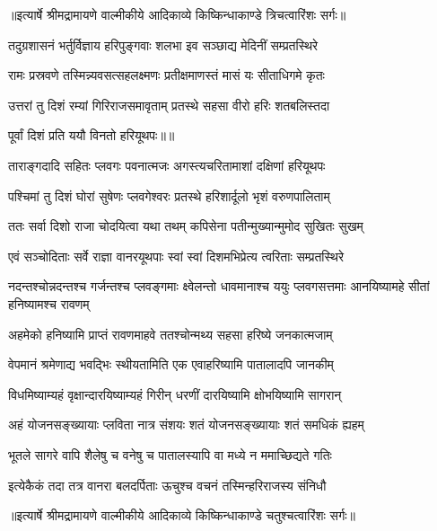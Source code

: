{॥इत्यार्षे श्रीमद्रामायणे वाल्मीकीये आदिकाव्ये किष्किन्धाकाण्डे त्रिचत्वारिंशः सर्गः॥}


\twolineshloka
{तदुग्रशासनं भर्तुर्विज्ञाय हरिपुङ्गवाः}
{शलभा इव सञ्छाद्य मेदिनीं सम्प्रतस्थिरे} %

\twolineshloka
{रामः प्रस्रवणे तस्मिन्न्यवसत्सहलक्ष्मणः}
{प्रतीक्षमाणस्तं मासं यः सीताधिगमे कृतः} %

\twolineshloka
{उत्तरां तु दिशं रम्यां गिरिराजसमावृताम्}
{प्रतस्थे सहसा वीरो हरिः शतबलिस्तदा} %

{पूर्वां दिशं प्रति ययौ विनतो हरियूथपः॥॥} %

\addtocounter{shlokacount}{1}

\twolineshloka
{ताराङ्गदादि सहितः प्लवगः पवनात्मजः}
{अगस्त्यचरितामाशां दक्षिणां हरियूथपः} %

\twolineshloka
{पश्चिमां तु दिशं घोरां सुषेणः प्लवगेश्वरः}
{प्रतस्थे हरिशार्दूलो भृशं वरुणपालिताम्} %

\twolineshloka
{ततः सर्वा दिशो राजा चोदयित्वा यथा तथम्}
{कपिसेना पतीन्मुख्यान्मुमोद सुखितः सुखम्} %

\twolineshloka
{एवं सञ्चोदिताः सर्वे राज्ञा वानरयूथपाः}
{स्वां स्वां दिशमभिप्रेत्य त्वरिताः सम्प्रतस्थिरे} %

\threelineshloka
{नदन्तश्चोन्नदन्तश्च गर्जन्तश्च प्लवङ्गमाः}
{क्ष्वेलन्तो धावमानाश्च ययुः प्लवगसत्तमाः}
{आनयिष्यामहे सीतां हनिष्यामश्च रावणम्} %

\twolineshloka
{अहमेको हनिष्यामि प्राप्तं रावणमाहवे}
{ततश्चोन्मथ्य सहसा हरिष्ये जनकात्मजाम्} %

\twolineshloka
{वेपमानं श्रमेणाद्य भवद्भिः स्थीयतामिति}
{एक एवाहरिष्यामि पातालादपि जानकीम्} %

\twolineshloka
{विधमिष्याम्यहं वृक्षान्दारयिष्याम्यहं गिरीन्}
{धरणीं दारयिष्यामि क्षोभयिष्यामि सागरान्} %

\twolineshloka
{अहं योजनसङ्ख्यायाः प्लविता नात्र संशयः}
{शतं योजनसङ्ख्यायाः शतं समधिकं ह्यहम्} %

\twolineshloka
{भूतले सागरे वापि शैलेषु च वनेषु च}
{पातालस्यापि वा मध्ये न ममाच्छिद्यते गतिः} %

\twolineshloka
{इत्येकैकं तदा तत्र वानरा बलदर्पिताः}
{ऊचुश्च वचनं तस्मिन्हरिराजस्य संनिधौ} %


{॥इत्यार्षे श्रीमद्रामायणे वाल्मीकीये आदिकाव्ये किष्किन्धाकाण्डे चतुश्चत्वारिंशः सर्गः॥}

